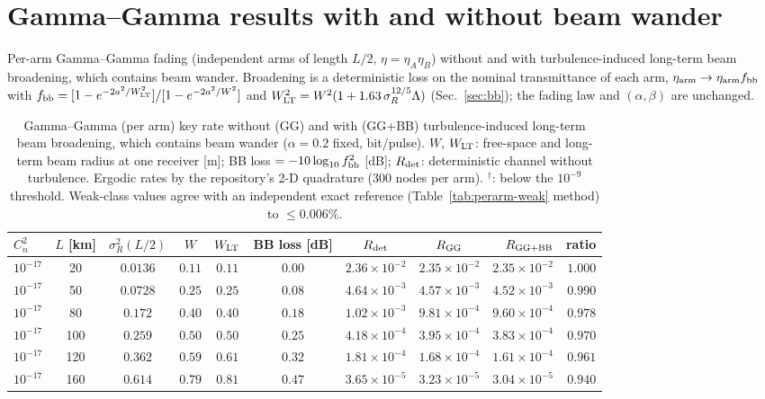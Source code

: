 \documentclass[11pt,a4paper]{article}
\theoremstyle{plain}
\theoremstyle{remark}
\begin{document}
\section{Gamma--Gamma results with and without beam wander}
\label{sec:bw}
Per-arm Gamma--Gamma fading (independent arms of length $L/2$, $\eta=\eta_A\eta_B$) without and with turbulence-induced long-term beam broadening, which contains beam wander. Broadening is a deterministic loss on the nominal transmittance of each arm, $\eta_{\rm arm}\to\eta_{\rm arm}f_{\rm bb}$ with $f_{\rm bb}=[1-e^{-2a^2/W_{\rm LT}^2}]/[1-e^{-2a^2/W^2}]$ and $W_{\rm LT}^2=W^2(1+1.63\,\sigma_R^{12/5}\Lambda)$ (Sec.~\ref{sec:bb}); the fading law and $(\alpha,\beta)$ are unchanged.
\begin{table}[htbp]
\centering\scriptsize
\caption{Gamma--Gamma (per arm) key rate without (GG) and with (GG+BB) turbulence-induced long-term beam broadening, which contains beam wander ($\alpha=0.2$ fixed, bit/pulse). $W$, $W_{\rm LT}$: free-space and long-term beam radius at one receiver [m]; BB loss $=-10\log_{10}f_{\rm bb}^2$ [dB]; $R_{\rm det}$: deterministic channel without turbulence. Ergodic rates by the repository's 2-D quadrature (300 nodes per arm). $^{\dagger}$: below the $10^{-9}$ threshold. Weak-class values agree with an independent exact reference (Table~\ref{tab:perarm-weak} method) to $\le0.006\%$.}
\label{tab:bw-skr}
\begin{tabular}{lcccccccrr}
\toprule
$C_n^2$ & $L$ [km] & $\sigma_R^2(L/2)$ & $W$ & $W_{\rm LT}$ & BB loss [dB] & $R_{\rm det}$ & $R_{\rm GG}$ & $R_{\rm GG+BB}$ & ratio\\
\midrule
$10^{-17}$ & 20 & $0.0136$ & $0.11$ & $0.11$ & $0.00$ & $2.36\times10^{-2}$ & $2.35\times10^{-2}$ & $2.35\times10^{-2}$ & $1.000$ \\
$10^{-17}$ & 50 & $0.0728$ & $0.25$ & $0.25$ & $0.08$ & $4.64\times10^{-3}$ & $4.57\times10^{-3}$ & $4.52\times10^{-3}$ & $0.990$ \\
$10^{-17}$ & 80 & $0.172$ & $0.40$ & $0.40$ & $0.18$ & $1.02\times10^{-3}$ & $9.81\times10^{-4}$ & $9.60\times10^{-4}$ & $0.978$ \\
$10^{-17}$ & 100 & $0.259$ & $0.50$ & $0.50$ & $0.25$ & $4.18\times10^{-4}$ & $3.95\times10^{-4}$ & $3.83\times10^{-4}$ & $0.970$ \\
$10^{-17}$ & 120 & $0.362$ & $0.59$ & $0.61$ & $0.32$ & $1.81\times10^{-4}$ & $1.68\times10^{-4}$ & $1.61\times10^{-4}$ & $0.961$ \\
$10^{-17}$ & 160 & $0.614$ & $0.79$ & $0.81$ & $0.47$ & $3.65\times10^{-5}$ & $3.23\times10^{-5}$ & $3.04\times10^{-5}$ & $0.940$ \\

\end{tabular}
\end{table}
\end{document}
